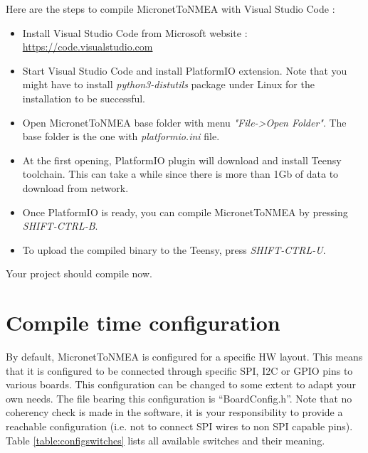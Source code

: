 \documentclass{report}
\begin{document}
Here are the steps to compile MicronetToNMEA with Visual Studio Code :

\begin{itemize}
\item Install Visual Studio Code from Microsoft website : \url{https://code.visualstudio.com}
\item Start Visual Studio Code and install PlatformIO extension. Note that you might have to install \emph{python3-distutils} package under Linux for the installation to be successful.
\item Open MicronetToNMEA base folder with menu \emph{"File->Open Folder"}. The base folder is the one with \emph{platformio.ini} file.
\item At the first opening, PlatformIO plugin will download and install Teensy toolchain. This can take a while since there is more than 1Gb of data to download from network.
\item Once PlatformIO is ready, you can compile MicronetToNMEA by pressing \emph{SHIFT-CTRL-B}.
\item To upload the compiled binary to the Teensy, press \emph{SHIFT-CTRL-U}.
\end{itemize}

Your project should compile now.

\section{Compile time configuration}
\label{compile-time-configuration}

By default, MicronetToNMEA is configured for a specific HW layout. This means that it is configured to be connected through specific SPI, I2C or GPIO pins to various boards. This configuration can be changed to some extent to adapt your own needs. The file bearing this configuration is “BoardConfig.h”. Note that no coherency check is made in the software, it is your responsibility to provide a reachable configuration (i.e. not to connect SPI wires to non SPI capable pins). Table {\ref{table:configswitches}} lists all available switches and their meaning.
\end{document}

